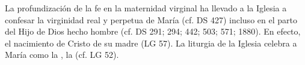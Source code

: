 	
	 La profundización de la fe en la maternidad virginal ha llevado a la Iglesia a confesar la virginidad real y perpetua de María (cf. DS 427) incluso en el parto del Hijo de Dios hecho hombre (cf. DS 291; 294; 442; 503; 571; 1880). En efecto, el nacimiento de Cristo  de su madre (LG 57). La liturgia de la Iglesia celebra a María como la , la  (cf. LG 52).
